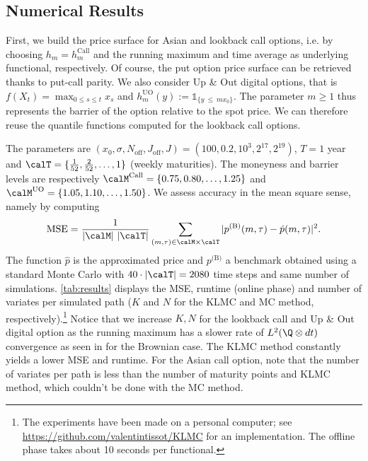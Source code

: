 \subsection{Numerical Results} \label{sec:numResultPrice}
First, we build the price surface for  Asian and lookback call options, i.e. by choosing $h_m = h^{\text{Call}}_m$ and the running maximum and time average as underlying functional, respectively. Of course, the put option price surface can  be retrieved thanks to  put-call parity. We also consider Up \& Out digital options, that is $f(X_t)=\max_{0\le s \le t}x_s$  and   $h^{\text{UO}}_m(y):=\mathds{1}_{\{y \ \le \ m x_0\}}$. The parameter $m\ge 1$ thus represents the barrier of the option relative to the spot price. 
We can therefore reuse the quantile functions computed for the lookback call options.

The parameters are $(x_0,\sigma,N_{\text{off}},J_{\text{off}},J) = (100, 0.2, 10^3, 2^{17}, 2^{19})$, 
 $T=1$ year and $\calT =  \{\frac{1}{52},\frac{2}{52},\ldots,1\}$ (weekly maturities). 
The moneyness and barrier levels are respectively $\calM^{\text{Call}} = \{0.75,0.80,\ldots,1.25\}$ and $\calM^{\text{UO}} = \{1.05,1.10,\ldots,1.50\}$. 
We assess  accuracy  in the mean square sense, namely by computing 
$$
\text{MSE} =  \frac{1}{|\calM|\ |\calT|}\sum_{(m,\tau) \in \calM \times \calT} |p^{\text{(B)}}(m,\tau) - \hat{p}(m,\tau)|^2. 
$$ The function $\hat{p}$ is the approximated price and $p^{\text{(B)}}$ a benchmark obtained using a standard Monte Carlo with $40 \cdot |\calT| = 2080$ time steps and same number of simulations. 
  \cref{tab:results} displays the MSE, runtime (online phase) and number of variates per simulated path ($K$ and $N$ for the KLMC and MC method, respectively).\footnote{The experiments have been made on a personal computer; see \href{https://github.com/valentintissot/KLMC.git}{https://github.com/valentintissot/KLMC} for an implementation. The offline phase takes about 10 seconds per  functional.}  Notice that we increase $K,N$  for the lookback call and Up \& Out digital option as the running maximum has a slower rate of $L^2(\Q\otimes dt)$ convergence  as seen in  for the Brownian case.  The KLMC method constantly yields a lower MSE and runtime.  For the Asian call option, note that the number of variates per path is less than the number of maturity points and KLMC method, which couldn't be done with the MC method. 
  
 \vspace{-1mm}

